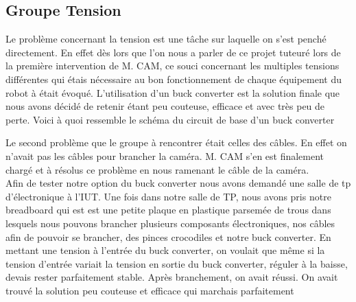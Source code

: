 

\subsection{Groupe Tension}

Le problème concernant la tension est une tâche sur laquelle on s’est penché directement. En effet dès lors que l’on nous a parler de ce projet tuteuré lors de la première intervention de M. CAM, ce souci concernant les multiples tensions différentes qui étais nécessaire au bon fonctionnement de chaque équipement du robot à était évoqué. L’utilisation d’un buck converter est la solution finale que nous avons décidé de retenir étant peu couteuse, efficace et avec très peu de perte. 
Voici à quoi ressemble le schéma du circuit de base d’un buck converter



Le second problème que le groupe à rencontrer était celles des câbles. En effet on n’avait pas les câbles pour brancher la caméra. M. CAM s’en est finalement chargé et à résolus ce problème en nous ramenant le câble de la caméra. 
\\

Afin de tester notre option du buck converter nous avons demandé une salle de tp d’électronique à l’IUT. Une fois dans notre salle de TP, nous avons pris notre breadboard qui est est une petite plaque en plastique parsemée de trous dans lesquels nous pouvons brancher plusieurs composants électroniques, nos câbles afin de pouvoir se brancher, des pinces crocodiles et notre buck converter. En mettant une tension à l’entrée du buck converter, on voulait que même si la tension d’entrée variait la tension en sortie du buck converter, réguler à la baisse, devais rester parfaitement stable. Après branchement, on avait réussi. On avait trouvé la solution peu couteuse et efficace qui marchais parfaitement






